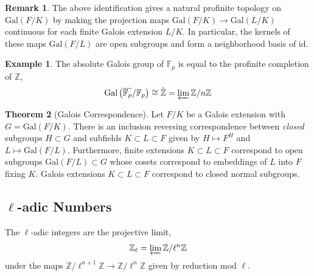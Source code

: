 \documentclass{article}
\newcommand{\Gal}[1]{\mathrm{Gal}\left( #1 \right)}
\newcommand{\Z}{\mathbb{Z}}
\newcommand{\id}{\mathrm{id}}
\theoremstyle{definition}
\newtheorem{theorem}{Theorem}[section]
\newtheorem{example}[theorem]{Example}
\newtheorem{remark}{Remark}[section]
\newenvironment{definition}[1][Definition:]{\begin{trivlist}
\item[\hskip \labelsep {\bfseries #1}]}{\end{trivlist}}
\newcommand{\finfield}[1]{\mathbb{F}_{#1}}
\begin{document}
\begin{remark}
The above identification gives a natural profinite topology on $\Gal{F/ K}$ by making the projection maps $\Gal{F / K} \to \Gal{L / K}$ continuous for each finite Galois extension $L / K$. In particular, the kernels of these maps $\Gal{F / L}$ are open subgroups and form a neighborhood basis of $\id$. 
\end{remark}

\begin{example}
The absolute Galois group of $\finfield{p}$ is equal to the profinite completion of $\Z$, 
\[ \Gal{\overline{\finfield{p}} / \finfield{p}} \cong \hat{\Z} = \varprojlim \Z / n \Z \]
\end{example}

\begin{theorem}[Galois Correspondence]
Let $F / K$ be a Galois extension with $G = \Gal{F / K}$. There is an inclusion reversing correspondence between \textit{closed} subgroups $H \subset G$ and subfields $K \subset L \subset F$ given by $H \mapsto F^H$ and $L \mapsto \Gal{F / L}$.
Furthermore, finite extensions $K \subset L \subset F$ correspond to open subgroups $\Gal{F / L} \subset G$ whose cosets correspond to embeddings of $L$ into $F$ fixing $K$. Galois extensions $K \subset L \subset F$ correspond to closed normal subgroups. 
\end{theorem}


\subsection{$\ell$-adic Numbers}

\begin{definition}
The $\ell$-adic integers are the projective limit,
\[ \Z_{\ell} = \varprojlim \Z / \ell^n \Z \]
under the maps $\Z / \ell^{n+1} \Z \to \Z / \ell^n \Z$ given by reduction mod $\ell$. 
\end{definition}
\end{document}
